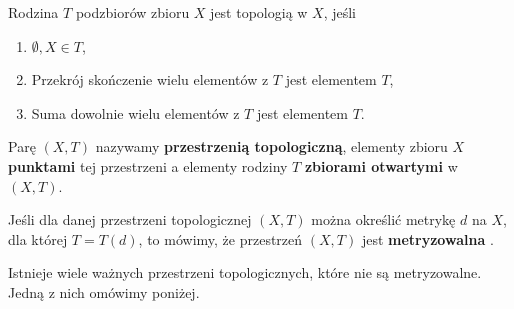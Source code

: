 \begin{definition}[1.2.1 - topologia]
	Rodzina $T$ podzbiorów zbioru $X$ jest topologią w $X$, jeśli
	\begin{enumerate}[label=\arabic*)]
		\item $\emptyset, X \in T$,
		\item Przekrój skończenie wielu elementów z $T$ jest elementem $T$,
		\item Suma dowolnie wielu elementów z $T$ jest elementem $T$.
	\end{enumerate}

	\noindent Parę $\left( X,T \right) $ nazywamy \textbf{przestrzenią topologiczną}, elementy zbioru $X$ \textbf{punktami} tej przestrzeni a elementy rodziny $T$ \textbf{zbiorami otwartymi} w $\left( X, T \right) $.	
\end{definition} 

\begin{definition}
	
	Jeśli dla danej przestrzeni topologicznej $\left( X,T \right) $ można określić metrykę $d$ na $X$, dla której $T = T\left( d \right) $, to mówimy, że przestrzeń $\left( X,T \right) $ jest \textbf{metryzowalna} .
\end{definition} 

Istnieje wiele ważnych przestrzeni topologicznych, które nie są metryzowalne. Jedną z nich omówimy poniżej.

